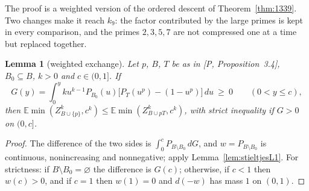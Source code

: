 \documentclass[11pt]{article}
\newtheorem{lemma}[theorem]{Lemma}
\theoremstyle{remark}
\newcommand{\E}{\mathbb{E}}
\begin{document}
The proof is a weighted version of the ordered descent of Theorem~\ref{thm:1339}. Two changes
make it reach $k_9$: the factor contributed by the large primes is kept in every comparison,
and the primes $2,3,5,7$ are not compressed one at a time but replaced together.

\begin{lemma}[weighted exchange]\label{lem:wexch}
Let $p$, $B$, $T$ be as in [P, Proposition~3.4], $B_0\subseteq B$, $k>0$ and $c\in(0,1]$. If
\[
G(y)=\int_0^yku^{k-1}P_{B_0}(u)\bigl[P_T(u^p)-(1-u^p)\bigr]\,du\ \ge\ 0\qquad(0<y\le c),
\]
then $\E\min(Z_{B\cup\{p\}}^k,c^k)\le\E\min(Z_{B\cup pT}^k,c^k)$, with strict inequality if $G>0$
on $(0,c]$.
\end{lemma}

\begin{proof}
The difference of the two sides is $\int_0^cP_{B\setminus B_0}\,dG$, and $w=P_{B\setminus B_0}$ is
continuous, nonincreasing and nonnegative; apply Lemma~\ref{lem:stieltjesL1}. For strictness: if
$B\setminus B_0=\varnothing$ the difference is $G(c)$; otherwise, if $c<1$ then $w(c)>0$, and if
$c=1$ then $w(1)=0$ and $d(-w)$ has mass $1$ on $(0,1)$.
\end{proof}
\end{document}
